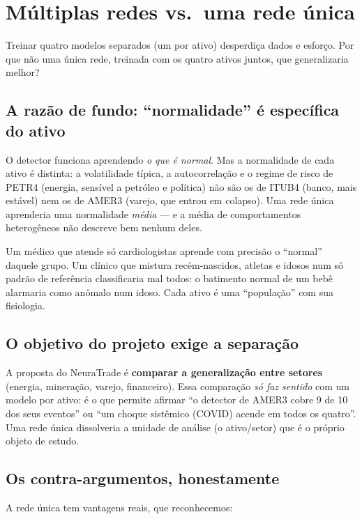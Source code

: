 \section{Múltiplas redes vs.\ uma rede única}
\label{sec:debate-multi}

\begin{confronto}
Treinar quatro modelos separados (um por ativo) desperdiça dados e esforço. Por
que não uma única rede, treinada com os quatro ativos juntos, que generalizaria
melhor?
\end{confronto}

\subsection{A razão de fundo: ``normalidade'' é específica do ativo}
O detector funciona aprendendo \emph{o que é normal}. Mas a normalidade de cada
ativo é distinta: a volatilidade típica, a autocorrelação e o regime de risco de
PETR4 (energia, sensível a petróleo e política) não são os de ITUB4 (banco,
mais estável) nem os de AMER3 (varejo, que entrou em colapso). Uma rede única
aprenderia uma normalidade \emph{média} --- e a média de comportamentos
heterogêneos não descreve bem nenhum deles.

\begin{intuicao}
Um médico que atende só cardiologistas aprende com precisão o ``normal'' daquele
grupo. Um clínico que mistura recém-nascidos, atletas e idosos num só padrão de
referência classificaria mal todos: o batimento normal de um bebê alarmaria como
anômalo num idoso. Cada ativo é uma ``população'' com sua fisiologia.
\end{intuicao}

\subsection{O objetivo do projeto exige a separação}
A proposta do NeuraTrade é \textbf{comparar a generalização entre setores}
(energia, mineração, varejo, financeiro). Essa comparação \emph{só faz sentido}
com um modelo por ativo: é o que permite afirmar ``o detector de AMER3 cobre 9
de 10 dos seus eventos'' ou ``um choque sistêmico (COVID) acende em todos os
quatro''. Uma rede única dissolveria a unidade de análise (o ativo/setor) que é
o próprio objeto de estudo.

\subsection{Os contra-argumentos, honestamente}
A rede única tem vantagens reais, que reconhecemos:

